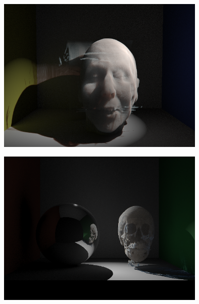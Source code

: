\documentclass[10pt,compress,professionalfont]{beamer}
\begin{document}
\begin{frame}[c]{}

    {\centering
    \includegraphics[width=100mm]{../img/face1}\\
    }

\end{frame}




\begin{frame}[c]{}

    {\centering
    \includegraphics[width=100mm]{../img/sphere_skull}\\
    }

\end{frame}
\end{document}
